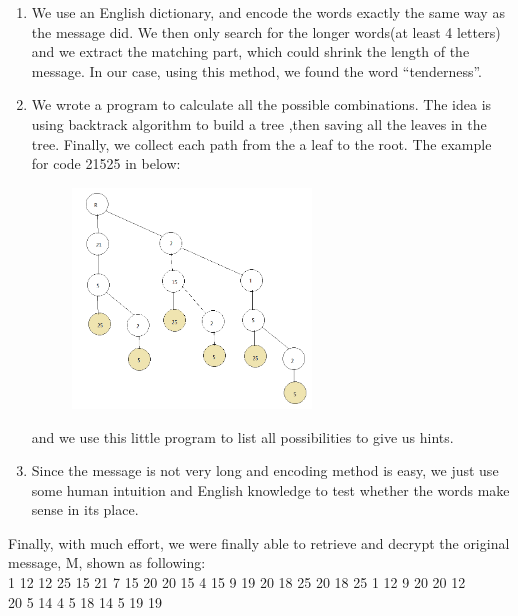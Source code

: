 \documentclass[12pt]{article} %
\begin{document}
	\renewcommand\labelenumi{\arabic{enumi}.}
	\begin{enumerate}
		\item We use an English dictionary, and encode the words exactly the same way as the message did. We then only search for the longer words(at least 4 letters) and we extract the matching part, which could shrink the length of the message. In our case, using this method, we found the word ``tenderness''.
		
		\item We wrote a program to calculate all the possible combinations. The idea is using backtrack algorithm to build a tree ,then saving all the leaves in the tree. Finally, we collect each path from the a leaf to the root. The example for code 21525 in below: 
		
		\begin{figure}[h]

			\includegraphics[width=0.6\textwidth]{tree.png}
		\end{figure}
		
		
		and we use this little program to list all possibilities to give us hints.
		
		\item Since the message is not very long and encoding method is easy, we just use some human intuition and English knowledge to test whether the words make sense in its place.
		
	\end{enumerate}
	
	Finally, with much effort, we were finally able to retrieve and decrypt the original message, M, shown as following:\\
	
	
	1 12 12 25 15 21 7 15 20 20 15 4 15 9 19 20 18 25 20 18 25 1 12 9 20 20 12 \\
	 20 5 14 4 5 18 14 5 19 19\\
	
\end{document}
